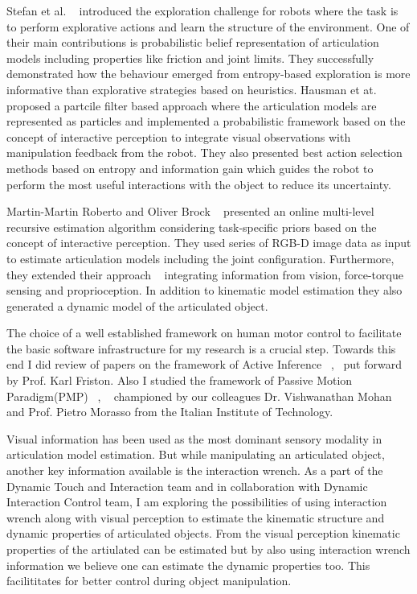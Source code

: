\documentclass[12pt,a4paper]{report}
\begin{document}
Stefan et al. ~\cite{otte2014entropy} introduced the exploration challenge for robots where the task is to perform explorative actions and learn the structure of the environment. One of their main contributions is probabilistic belief representation of articulation models including properties like friction and joint limits. They successfully demonstrated how the behaviour emerged from entropy-based exploration is more informative than explorative strategies based on heuristics. Hausman et at. ~\cite{hausman2015active} proposed a partcile filter based approach where the articulation models are represented as particles and implemented a probabilistic framework based on the concept of interactive perception to integrate visual observations with manipulation feedback from the robot. They also presented best action selection methods based on entropy and information gain which guides the robot to perform the most useful interactions with the object to reduce its uncertainty.

Martin-Martin Roberto and Oliver Brock ~\cite{martin2014online} presented an online multi-level recursive estimation algorithm considering task-specific priors based on the concept of interactive perception. They used series of RGB-D image data as input to estimate articulation models including the joint configuration. Furthermore, they extended their approach ~\cite{martin2017building} integrating information from vision, force-torque sensing and proprioception. In addition to kinematic model estimation they also generated a dynamic model of the articulated object. 

The choice of a well established framework on human motor control to facilitate the basic software infrastructure for my research is a crucial step. Towards this end I did review of papers on the framework of Active Inference ~\cite{friston2015active},~\cite{friston2011action} put forward by Prof. Karl Friston. Also I studied the framework of Passive Motion Paradigm(PMP) ~\cite{mohan2011passive}, ~\cite{mohan2013inference} championed by our colleagues Dr. Vishwanathan Mohan and Prof. Pietro Morasso from the Italian Institute of Technology.

Visual information has been used as the most dominant sensory modality in articulation model estimation. But while manipulating an articulated object, another key information available is the interaction wrench. As a part of the Dynamic Touch and Interaction team and in collaboration with Dynamic Interaction Control  team, I am  exploring the possibilities of using interaction wrench along with visual perception  to estimate the kinematic structure and dynamic properties of articulated objects. From the visual perception kinematic properties of the artiulated can be estimated but by also using interaction wrench information we believe one can estimate the dynamic properties too. This facilititates for better control during object manipulation.
 
\end{document}
